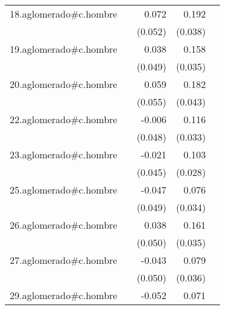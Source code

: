 {\begin{longtable}{l*{4}{D{.}{.}{-1}}}
\addlinespace
18.aglomerado#c.hombre&                     &       0.072         &       0.192\sym{***}&                     \\
            &                     &     (0.052)         &     (0.038)         &                     \\
\addlinespace
19.aglomerado#c.hombre&                     &       0.038         &       0.158\sym{***}&                     \\
            &                     &     (0.049)         &     (0.035)         &                     \\
\addlinespace
20.aglomerado#c.hombre&                     &       0.059         &       0.182\sym{***}&                     \\
            &                     &     (0.055)         &     (0.043)         &                     \\
\addlinespace
22.aglomerado#c.hombre&                     &      -0.006         &       0.116\sym{***}&                     \\
            &                     &     (0.048)         &     (0.033)         &                     \\
\addlinespace
23.aglomerado#c.hombre&                     &      -0.021         &       0.103\sym{***}&                     \\
            &                     &     (0.045)         &     (0.028)         &                     \\
\addlinespace
25.aglomerado#c.hombre&                     &      -0.047         &       0.076\sym{*}  &                     \\
            &                     &     (0.049)         &     (0.034)         &                     \\
\addlinespace
26.aglomerado#c.hombre&                     &       0.038         &       0.161\sym{***}&                     \\
            &                     &     (0.050)         &     (0.035)         &                     \\
\addlinespace
27.aglomerado#c.hombre&                     &      -0.043         &       0.079\sym{*}  &                     \\
            &                     &     (0.050)         &     (0.036)         &                     \\
\addlinespace
29.aglomerado#c.hombre&                     &      -0.052         &       0.071\sym{*}  &                     \\

\end{longtable}}
